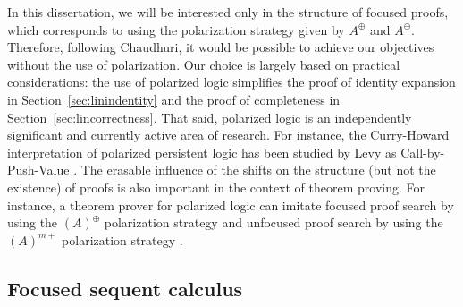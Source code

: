 In this dissertation, we will be interested only in the structure of focused
proofs, which corresponds to using the polarization strategy given by
$A^\oplus$ and $A^\ominus$. Therefore, following Chaudhuri, it would
be possible to achieve our objectives without the use of polarization.
Our choice is largely based on practical
considerations: the use of polarized logic simplifies the proof of
identity expansion in Section~\ref{sec:linindentity} and the proof of
completeness in Section~\ref{sec:lincorrectness}. That said, polarized
logic is an independently significant and currently active area of
research. For instance, the Curry-Howard
interpretation of polarized persistent logic has been studied by Levy
as Call-by-Push-Value \cite{levy04call}. The erasable influence of the
shifts on the structure (but not the existence) of proofs is also
important in the context of theorem proving. For instance, a theorem
prover for polarized logic can imitate focused proof search by using
the $(A)^\oplus$ polarization strategy and unfocused proof search by
using the $(A)^{m+}$ polarization strategy
\cite{mclaughlin09efficient}.

\subsection{Focused sequent calculus}
\label{sec:linfocseqcalcdef}


